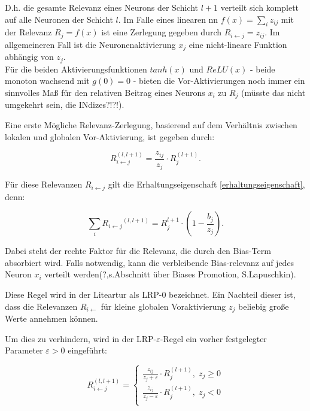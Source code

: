 \documentclass[11pt,a4paper]{article}
\numberwithin{equation}{section}
\begin{document}
	D.h. die gesamte Relevanz eines Neurons der Schicht $l+1$ verteilt sich komplett auf alle Neuronen der Schicht $l$.
	Im Falle eines linearen \gls{nn} $f(x) = \sum_i{z_{ij}}$ mit der Relevanz $R_j = f(x)$ ist eine Zerlegung gegeben durch $R_{i\leftarrow j} = z_{ij}.$
	Im allgemeineren Fall ist die Neuronenaktivierung $x_j$ eine nicht-lineare Funktion abhängig von $z_j$.\\
	Für die beiden Aktivierungsfunktionen $tanh(x)$ und $ReLU(x)$ - beide monoton wachsend mit $g(0)=0$ - bieten die Vor-Aktivierungen noch immer ein sinnvolles Maß für den relativen Beitrag eines Neurons $x_i$ zu $R_j$ (müsste das nicht umgekehrt sein, die INdizes?!?!).
	
	Eine erste Mögliche Relevanz-Zerlegung, basierend auf dem Verhältnis zwischen lokalen und globalen Vor-Aktivierung, ist gegeben durch:
	
	\begin{equation}
	R_{i\leftarrow j}^{(l,l+1)} = \frac{z_{ij}}{z_j} \cdot R_j^{(l+1)}.
	\end{equation}
	
	Für diese Relevanzen $R_{i \leftarrow j}$ gilt die Erhaltungseigenschaft \ref{erhaltungseigenschaft}, denn:
	
	\begin{equation}
	\sum_i{R_{i \leftarrow j}}^{(l,l+1)} = R_{j}^{l+1} \cdot (1-\frac{b_j}{z_j}).
	\end{equation}
	
	Dabei steht der rechte Faktor für die Relevanz, die durch den Bias-Term absorbiert wird.
	Falls notwendig, kann die verbleibende Bias-relevanz auf jedes Neuron $x_i$ verteilt werden(?,s.Abschnitt über Biases Promotion, S.Lapuschkin).
	
	Diese Regel wird in der Liteartur als LRP-0 bezeichnet.
	Ein Nachteil dieser ist, dass die Relevanzen $R_{i \leftarrow}$ für kleine globalen Voraktivierung $z_j$ beliebig große Werte annehmen können.
	
	Um dies zu verhindern, wird in der LRP-$\varepsilon$-Regel ein vorher festgelegter Parameter $\varepsilon > 0$ eingeführt:
	
	\begin{equation}
	R_{i\leftarrow j}^{(l,l+1)} = \begin{cases}
	\frac{z_{ij}}{z_j +\varepsilon} \cdot R_j^{(l+1)}, \; z_j \geq 0\\
	\frac{z_{ij}}{z_j -\varepsilon}\cdot R_j^{(l+1)}, \; z_j < 0\\
	\end{cases}
	\end{equation}
	
\end{document}
